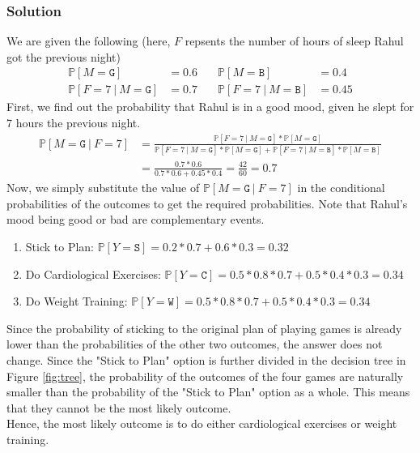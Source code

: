 \documentclass[12pt]{article}
\begin{document}
    \subsubsection*{Solution}
    We are given the following (here, $F$ repsents the number of hours of sleep Rahul got the previous night)
    \begin{align}
        \mathbb{P}[M = \texttt{G}] &= 0.6 &\quad \mathbb{P}[M = \texttt{B}] &= 0.4 \\
        \mathbb{P}[F = 7 \ | \ M = \texttt{G}] &= 0.7 &\quad \mathbb{P}[F = 7 \ | \ M = \texttt{B}] &= 0.45
    \end{align}
    First, we find out the probability that Rahul is in a good mood, given he slept for 7 hours
    the previous night.
    \begin{align}
        \mathbb{P}[M = \texttt{G} \ | \ F = 7] &= \frac{\mathbb{P}[F = 7 \ | \ M = \texttt{G}] * \mathbb{P}[M = \texttt{G}]}{\mathbb{P}[F = 7 \ | \ M = \texttt{G}] * \mathbb{P}[M = \texttt{G}] + \mathbb{P}[F = 7 \ | \ M = \texttt{B}] * \mathbb{P}[M = \texttt{B}]} \\
        &= \frac{0.7 * 0.6}{0.7 * 0.6 + 0.45 * 0.4} = \frac{42}{60} = 0.7
    \end{align}
    Now, we simply substitute the value of $\mathbb{P}[M = \texttt{G} \ | \ F = 7]$ in the conditional
    probabilities of the outcomes to get the required probabilities. Note that Rahul's mood being good
    or bad are complementary events.
    \begin{enumerate}
        \item Stick to Plan: $\mathbb{P}[Y = \texttt{S}] = 0.2 * 0.7 + 0.6 * 0.3 = 0.32$
        \item Do Cardiological Exercises: $\mathbb{P}[Y = \texttt{C}] = 0.5 * 0.8 * 0.7 + 0.5 * 0.4 * 0.3 = 0.34$
        \item Do Weight Training: $\mathbb{P}[Y = \texttt{W}] = 0.5 * 0.8 * 0.7 + 0.5 * 0.4 * 0.3 = 0.34$
    \end{enumerate}
    Since the probability of sticking to the original plan of playing games is already lower than the
    probabilities of the other two outcomes, the answer does not change. Since the "Stick to Plan" option
    is further divided in the decision tree in Figure \ref{fig:tree}, the probability of the outcomes
    of the four games are naturally smaller than the probability of the "Stick to Plan" option as a whole.
    This means that they cannot be the most likely outcome. \\
    Hence, the most likely outcome is to do either cardiological exercises or weight training.
\end{document}

